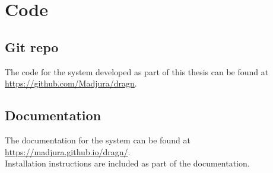 \chapter{Code}
\section{Git repo}
The code for the system developed as part of this thesis can be found at \\
\url{https://github.com/Madjura/dragn}.

\section{Documentation}
The documentation for the system can be found at \url{https://madjura.github.io/dragn/}.\\
Installation instructions are included as part of the documentation.
